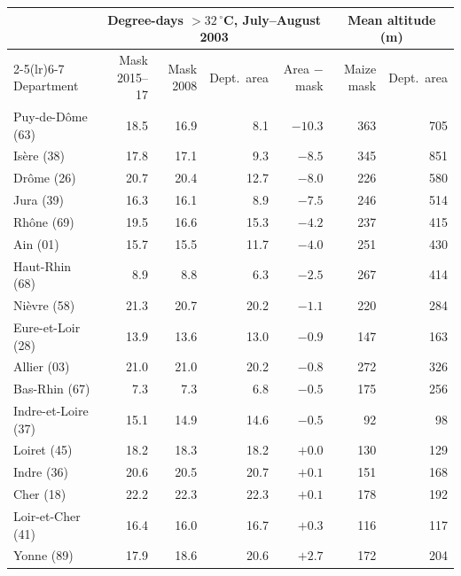 \begin{tabular}{lrrrrrr}
\toprule
 & \multicolumn{4}{c}{Degree-days $>32\,^{\circ}$C, July--August 2003} & \multicolumn{2}{c}{Mean altitude (m)} \\
\cmidrule(lr){2-5}\cmidrule(lr){6-7}
Department & Mask 2015--17 & Mask 2008 & Dept.\ area & Area $-$ mask & Maize mask & Dept.\ area \\
\midrule
Puy-de-Dôme (63) & 18.5 & 16.9 & 8.1 & $-10.3$ & 363 & 705 \\
Isère (38) & 17.8 & 17.1 & 9.3 & $-8.5$ & 345 & 851 \\
Drôme (26) & 20.7 & 20.4 & 12.7 & $-8.0$ & 226 & 580 \\
Jura (39) & 16.3 & 16.1 & 8.9 & $-7.5$ & 246 & 514 \\
Rhône (69) & 19.5 & 16.6 & 15.3 & $-4.2$ & 237 & 415 \\
Ain (01) & 15.7 & 15.5 & 11.7 & $-4.0$ & 251 & 430 \\
Haut-Rhin (68) & 8.9 & 8.8 & 6.3 & $-2.5$ & 267 & 414 \\
Nièvre (58) & 21.3 & 20.7 & 20.2 & $-1.1$ & 220 & 284 \\
Eure-et-Loir (28) & 13.9 & 13.6 & 13.0 & $-0.9$ & 147 & 163 \\
Allier (03) & 21.0 & 21.0 & 20.2 & $-0.8$ & 272 & 326 \\
Bas-Rhin (67) & 7.3 & 7.3 & 6.8 & $-0.5$ & 175 & 256 \\
Indre-et-Loire (37) & 15.1 & 14.9 & 14.6 & $-0.5$ & 92 & 98 \\
Loiret (45) & 18.2 & 18.3 & 18.2 & $+0.0$ & 130 & 129 \\
Indre (36) & 20.6 & 20.5 & 20.7 & $+0.1$ & 151 & 168 \\
Cher (18) & 22.2 & 22.3 & 22.3 & $+0.1$ & 178 & 192 \\
Loir-et-Cher (41) & 16.4 & 16.0 & 16.7 & $+0.3$ & 116 & 117 \\
Yonne (89) & 17.9 & 18.6 & 20.6 & $+2.7$ & 172 & 204 \\
\bottomrule
\end{tabular}
